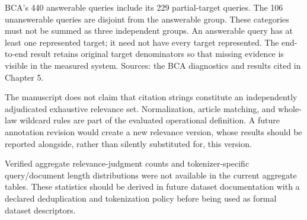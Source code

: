 BCA's 440 answerable queries include its 229 partial-target queries. The 106 unanswerable queries are disjoint from the answerable group. These categories must not be summed as three independent groups. An answerable query has at least one represented target; it need not have every target represented. The end-to-end result retains original target denominators so that missing evidence is visible in the measured system. Sources: the BCA diagnostics and results cited in Chapter 5.

The manuscript does not claim that citation strings constitute an independently adjudicated exhaustive relevance set. Normalization, article matching, and whole-law wildcard rules are part of the evaluated operational definition. A future annotation revision would create a new relevance version, whose results should be reported alongside, rather than silently substituted for, this version.

Verified aggregate relevance-judgment counts and tokenizer-specific query/document length distributions were not available in the current aggregate tables. These statistics should be derived in future dataset documentation with a declared deduplication and tokenization policy before being used as formal dataset descriptors.
